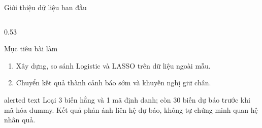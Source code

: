 \documentclass[10pt,aspectratio=169]{beamer}
\begin{document}
\begin{frame}{Giới thiệu dữ liệu ban đầu}
\begin{columns}[T,onlytextwidth]
\begin{column}{0.53\textwidth}
\begin{block}{Mục tiêu bài làm}
\begin{enumerate}
          \item Xây dựng, so sánh Logistic và LASSO trên dữ liệu ngoài mẫu.
          \item Chuyển kết quả thành cảnh báo sớm và khuyến nghị giữ chân.
        \end{enumerate}
      \end{block}
      \vspace{0.10cm}
      \begin{beamercolorbox}[sep=0.13cm,rounded=true]{alerted text}
        \small
        Loại 3 biến hằng và 1 mã định danh; còn 30 biến dự báo trước khi
        mã hóa dummy. Kết quả phản ánh liên hệ dự báo, không tự chứng minh
        quan hệ nhân quả.
      \end{beamercolorbox}
    \end{column}
  \end{columns}
\end{frame}
\end{document}
